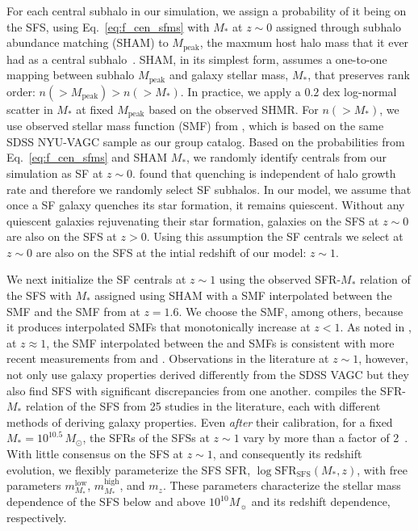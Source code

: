 \documentclass[12pt, letterpaper, preprint, tighten]{aastex62}
\newcommand{\todo}[1]{{\bf \textcolor{red}{#1}}}
\begin{document}
For each central subhalo in our simulation, we assign a probability of it 
being on the SFS, using Eq.~\ref{eq:f_cen_sfms} with $M_*$ at $z \sim 0$ 
assigned through subhalo abundance matching (SHAM) to $M_\mathrm{peak}$, 
the maxmum host halo mass that it ever had as a central subhalo~\citep{conroy2006,vale2006,yang2009,wetzel2012,leja2013,wetzel2013,wetzel2014,hahn2017b}. 
SHAM, in its simplest form, assumes a one-to-one mapping between subhalo 
$M_\mathrm{peak}$ and galaxy stellar mass, $M_*$, that preserves rank 
order: $n({>}M_\mathrm{peak}) > n({>}M_*)$. In practice, we apply a $0.2$ 
dex log-normal scatter in $M_*$ at fixed $M_\mathrm{peak}$ based on the 
observed SHMR. For $n({>}M_*)$, we use observed stellar mass function (SMF) 
from \cite{li2009}, which is based on the same SDSS NYU-VAGC sample as our 
group catalog. Based on the probabilities from Eq.~\ref{eq:f_cen_sfms} and 
SHAM $M_*$, we randomly identify centrals from our simulation as SF at 
$z \sim 0$. \cite{tinker2017b,tinker2018} found that quenching is 
independent of halo growth rate and therefore we randomly select SF subhalos.  
In our model, we assume that once a SF galaxy quenches its star formation, 
it remains quiescent.  %
Without any quiescent galaxies rejuvenating their star formation, galaxies
on the SFS at $z\sim0$ are also on the SFS at $z > 0$. Using this assumption
the SF centrals we select at $z \sim 0$ are also on the SFS at the intial
redshift of our model: $z \sim 1$. 

We next initialize the SF centrals at $z\sim1$ using the observed SFR-$M_*$ 
relation of the SFS with $M_*$ assigned using SHAM with a SMF interpolated
between the \cite{li2009} SMF and the SMF from \cite{marchesini2009} at 
$z = 1.6$. We choose the \cite{marchesini2009} SMF, among others, because it 
produces interpolated SMFs that monotonically increase at $z < 1$. As noted 
in \cite{hahn2017b}, at $z \approx 1$, the SMF interpolated between the 
\cite{li2009} and \cite{marchesini2009} SMFs is consistent with more recent 
measurements from \cite{muzzin2013} and \cite{ilbert2013}. Observations in 
the literature at $z \sim 1$, however, not only use galaxy properties 
derived differently from the SDSS VAGC but they also find SFS with significant 
discrepancies from one another. \cite{speagle2014} compiles the SFR-$M_*$ 
relation of the SFS from 25 studies in the literature, each with different 
methods of deriving galaxy properties. Even \emph{after} their calibration, 
for a fixed $M_* = 10^{10.5}\, M_\odot$, the SFRs of the SFSs at $z \sim 1$ 
vary by more than a factor of 2~\citep[see Figure 2 of][]{speagle2014}. 
With little consensus on the SFS at $z\sim1$, and consequently its redshift
evolution, we flexibly parameterize the SFS SFR, 
$\log\mathrm{SFR}_\mathrm{SFS}(M_*, z)$, 
with free parameters $m^\mathrm{low}_{M_*}$, $m^\mathrm{high}_{M_*}$, and 
$m_z$. These parameters characterize the stellar mass dependence of the SFS 
below and above $10^{10} M_\sun$ and its redshift dependence, respectively. 
\end{document}
